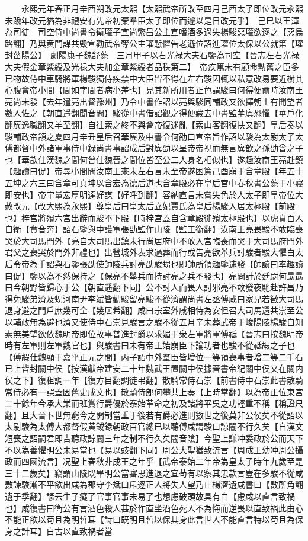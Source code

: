 　　永熙元年春正月辛酉朔改元太熙【太熙武帝所改至四月己酉太子即位改元永熙未踰年改元猶為非禮安有先帝初棄羣臣太子即位而遽以是日改元乎】　己巳以王渾為司徒　司空侍中尚書令衛瓘子宣尚繁昌公主宣嗜酒多過失楊駿惡瓘欲逐之【惡烏路翻】乃與黄門謀共毁宣勸武帝奪公主瓘慙懼告老遜位詔進瓘位太保以公就第【瓘封菑陽公】　劇陽康子魏舒薨　三月甲子以右光禄大夫石鑒為司空【晉志左右光禄大夫假金章紫綬及光禄大夫加金章紫綬者品秩第二】　帝疾篤未有顧命勲舊之臣多已物故侍中車騎將軍楊駿獨侍疾禁中大臣皆不得在左右駿因輒以私意改易要近樹其心腹會帝小間【間如字間者病小差也】見其新所用者正色謂駿曰何得便爾時汝南王亮尚未發【去年遣亮出督豫州】乃令中書作詔以亮與駿同輔政又欲擇朝士有聞望者數人佐之【朝直遥翻聞音問】駿從中書借詔觀之得便藏去中書監華廙恐懼【華戶化翻廙逸職翻又羊至翻】自往索之終不與會帝復迷亂【索山客翻復扶又翻】皇后奏以駿輔政帝頷之夏四月辛丑皇后召華廙及中書令何劭口宣帝旨作詔以駿為太尉太子太傅都督中外諸軍事侍中録尚書事詔成后對廙劭以呈帝帝視而無言廙歆之孫劭曾之子也【華歆仕漢魏之間何曾仕魏晉之間位皆至公二人身名相似也】遂趣汝南王亮赴鎮【趣讀曰促】帝尋小間問汝南王來未左右言未至帝遂困篤己酉崩于含章殿【年五十五坤之六三曰含章可貞坤以含宏為德后道也含章殿必在皇后宫中春秋書公薨于小寢即安也】帝宇量宏厚明達好謀【好呼到翻】容納直言未嘗失色於人太子即皇帝位大赦改元【改大熙為永熙】尊皇后曰皇太后立妃賈氏為皇后楊駿入居太極殿【前殿也】梓宫將殯六宫出辭而駿不下殿【時梓宫蓋自含章殿徙殯太極殿也】以虎賁百人自衛【賁音奔】詔石鑒與中護軍張劭監作山陵【監工銜翻】汝南王亮畏駿不敢臨喪哭於大司馬門外【亮自大司馬出鎮未行尚居府中不敢入宫臨喪而哭于大司馬府門外君父之喪哭於門外非禮也】出營城外表求過葬而行或告亮欲舉兵討駿者駿大懼白太后令帝為手詔與石鑒張劭使帥陵兵討亮劭駿甥也即帥所領趣鑒速發【帥讀曰率趣讀曰促】鑒以為不然保持之【保亮不舉兵而持討亮之兵不發也】亮問計於廷尉何朂朂曰今朝野皆歸心于公【朝直遥翻下同】公不討人而畏人討邪亮不敢發夜馳赴許昌乃得免駿弟濟及甥河南尹李斌皆勸駿留亮駿不從濟謂尚書左丞傅咸曰家兄若徵大司馬退身避之門戶庶幾可全【幾居希翻】咸曰宗室外戚相恃為安但召大司馬還共崇至公以輔政無為避也濟又使侍中石崇見駿言之駿不從五月辛未葬武帝于峻陽陵楊駿自知素無美望欲依魏明帝即位故事普進封爵以求媚于衆左軍將軍傅祗【晉志曰按魏明帝時有左軍則左軍魏官也】與駿書曰未有帝王始崩臣下論功者也駿不從祗嘏之子也【傅嘏仕魏顯于嘉平正元之間】丙子詔中外羣臣皆增位一等預喪事者增二等二千石已上皆封關中侯【按漢獻帝建安二十年魏武王置關中侯據晉書帝紀關中侯又在關内侯之下】復租調一年【復方目翻調徒弔翻】散騎常侍石崇【前書侍中石崇此書散騎常侍必有一誤蓋因舊史成文也】散騎侍郎何攀共上奏【上時掌翻】以為帝正位東宫二十餘年今承大業而班賞行爵優於泰始革命之初及諸將平吳之功輕重不稱【稱證尺翻】且大晉卜世無窮今之開制當垂于後若有爵必進則數世之後莫非公侯矣不從詔以太尉駿為太傅大都督假黄鉞録朝政百官總已以聽傅咸謂駿曰諒闇不行久矣【自漢文短喪之詔嗣君即吉聽政諒閽三年之制不行久矣闇音隂】今聖上謙冲委政於公而天下不以為善懼明公未易當也【易以豉翻下同】周公大聖猶致流言【周成王幼冲周公攝政而四國流言】况聖上春秋非成王之年乎【武帝泰始二年帝為皇太子時年九歲至是三十二歲矣】竊謂山陵既畢明公當審思進退之宜苟有以察其忠款言豈在多駿不從咸數諫駿漸不平欲出咸為郡守李斌曰斥逐正人將失人望乃止楊濟遺咸書曰【數所角翻遺于季翻】諺云生子癡了官事官事未易了也想慮破頭故具有白【慮咸以直言致禍也】咸復書曰衛公有言酒色殺人甚於作直坐酒色死人不為悔而逆畏以直致禍此由心不能正欲以苟且為明哲耳【詩曰既明且哲以保其身此言世人不能直言特以苟且為保身之計耳】自古以直致禍者當